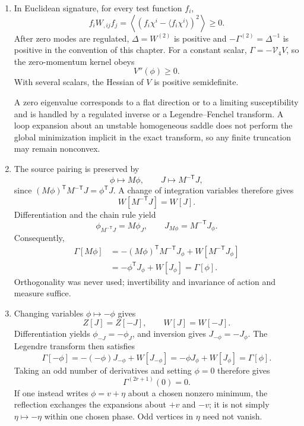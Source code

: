 \begin{enumerate}
  \begin{enumerate}
    \item[(a)]
    In Euclidean signature, for every test function \(f_i\),
    \[
      f_iW_{,ij}f_j
        =\left\langle (f_i\chi^i-\langle f_i\chi^i\rangle)^2
          \right\rangle\ge0.
    \]
    After zero modes are regulated, \(\Delta=W^{(2)}\) is positive and
    \(-\Gamma^{(2)}=\Delta^{-1}\) is positive in the convention of this
    chapter.  For a constant scalar,
    \(\Gamma=-\mathcal V_4V\), so the zero-momentum kernel obeys
    \[
      V''(\phi)\ge0.
    \]
    With several scalars, the Hessian of \(V\) is positive semidefinite.

    A zero eigenvalue corresponds to a flat direction or to a limiting
    susceptibility and is handled by a regulated inverse or a
    Legendre--Fenchel transform.  A loop expansion about an unstable
    homogeneous saddle does not perform the global minimization implicit in
    the exact transform, so any finite truncation may remain nonconvex.
    \item[(b)]
    The source pairing is preserved by
    \[
      \phi\mapsto M\phi,\qquad J\mapsto M^{-\mathsf T}J,
    \]
    since
    \((M\phi)^{\mathsf T}M^{-\mathsf T}J=\phi^{\mathsf T}J\).
    A change of integration variables therefore gives
    \[
      W[M^{-\mathsf T}J]=W[J].
    \]
    Differentiation and the chain rule yield
    \[
      \phi_{M^{-\mathsf T}J}=M\phi_J,
      \qquad
      J_{M\phi}=M^{-\mathsf T}J_\phi.
    \]
    Consequently,
    \[
      \begin{split}
      \Gamma[M\phi]
        &=-(M\phi)^{\mathsf T}M^{-\mathsf T}J_\phi
          +W[M^{-\mathsf T}J_\phi]\\
        &=-\phi^{\mathsf T}J_\phi+W[J_\phi]
         =\Gamma[\phi].
      \end{split}
    \]
    Orthogonality was never used; invertibility and invariance of action and
    measure suffice.
    \item[(c)]
    Changing variables \(\phi\mapsto-\phi\) gives
    \[
      Z[J]=Z[-J],\qquad W[J]=W[-J].
    \]
    Differentiation yields
    \(\phi_{-J}=-\phi_J\), and inversion gives
    \(J_{-\phi}=-J_\phi\).  The Legendre transform then satisfies
    \[
      \Gamma[-\phi]
        =-(-\phi)J_{-\phi}+W[J_{-\phi}]
        =-\phi J_\phi+W[J_\phi]
        =\Gamma[\phi].
    \]
    Taking an odd number of derivatives and setting \(\phi=0\) therefore
    gives
    \[
      \Gamma^{(2r+1)}(0)=0.
    \]
    If one instead writes \(\phi=v+\eta\) about a chosen nonzero minimum,
    the reflection exchanges the expansions about \(+v\) and \(-v\);
    it is not simply \(\eta\mapsto-\eta\) within one chosen phase.  Odd
    vertices in \(\eta\) need not vanish.
  \end{enumerate}


\end{enumerate}
